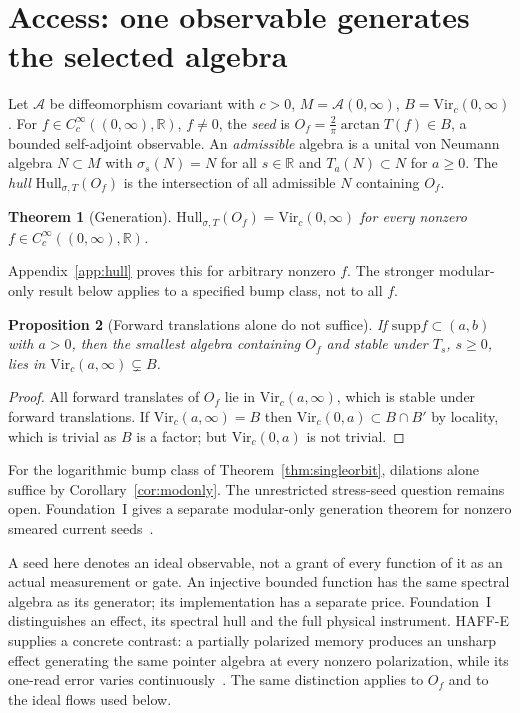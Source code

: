 \documentclass[12pt]{article}
\newtheorem{theorem}{Theorem}[section]
\newtheorem{proposition}[theorem]{Proposition}
\theoremstyle{definition}
\theoremstyle{remark}
\begin{document}
\section{Access: one observable generates the selected algebra}\label{sec:access}

Let \(\mathcal A\) be diffeomorphism covariant with \(c>0\), \(M=\mathcal A(0,\infty)\),
\(B=\mathrm{Vir}_c(0,\infty)\). For \(f\in C_c^\infty((0,\infty),\mathbb R)\), \(f\ne0\), the
\emph{seed} is \(O_f=\tfrac2\pi\arctan T(f)\in B\), a bounded self-adjoint
observable. An \emph{admissible} algebra is a unital von Neumann algebra
\(N\subset M\) with \(\sigma_s(N)=N\) for all \(s\in\mathbb R\) and \(T_a(N)\subset N\)
for \(a\ge0\). The \emph{hull} \(\mathrm{Hull}_{\sigma,T}(O_f)\) is the intersection of all
admissible \(N\) containing \(O_f\).

\begin{theorem}[Generation]\label{thm:hull}
\(\mathrm{Hull}_{\sigma,T}(O_f)=\mathrm{Vir}_c(0,\infty)\) for every nonzero
\(f\in C_c^\infty((0,\infty),\mathbb R)\).
\end{theorem}
Appendix~\ref{app:hull} proves this for arbitrary nonzero \(f\). The stronger
modular-only result below applies to a specified bump class, not to all \(f\).

\begin{proposition}[Forward translations alone do not suffice]\label{prop:transonly}
If \(\mathrm{supp}f\subset(a,b)\) with \(a>0\), then the smallest algebra containing
\(O_f\) and stable under \(T_s\), \(s\ge0\), lies in \(\mathrm{Vir}_c(a,\infty)\subsetneq B\).
\end{proposition}
\begin{proof}
All forward translates of \(O_f\) lie in \(\mathrm{Vir}_c(a,\infty)\), which is stable
under forward translations. If \(\mathrm{Vir}_c(a,\infty)=B\) then
\(\mathrm{Vir}_c(0,a)\subset B\cap B'\) by locality, which is trivial as \(B\) is a
factor; but \(\mathrm{Vir}_c(0,a)\) is not trivial.
\end{proof}
For the logarithmic bump class of Theorem~\ref{thm:singleorbit}, dilations
alone suffice by Corollary~\ref{cor:modonly}. The unrestricted stress-seed question
remains open. Foundation~I gives a separate modular-only generation theorem for
nonzero smeared current seeds~\cite{FoundationI}.

A seed here denotes an ideal observable, not a grant of every function of it
as an actual measurement or gate. An injective bounded function has the
same spectral algebra as its generator; its implementation has a separate price.
Foundation~I distinguishes an effect, its spectral hull and the full physical
instrument. HAFF-E supplies a concrete contrast: a partially polarized memory
produces an unsharp effect generating the same pointer algebra at every nonzero
polarization, while its one-read error varies continuously~\cite{PaperE}.
The same distinction applies to \(O_f\) and to the ideal flows used below.
\end{document}
